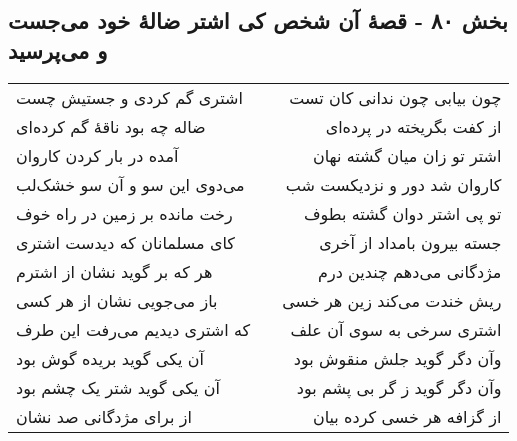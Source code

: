 \begin{center}
\section*{بخش ۸۰ - قصهٔ آن شخص کی اشتر ضالهٔ خود می‌جست و می‌پرسید}
\label{sec:sh080}
\begin{longtable}{l p{0.5cm} r}
اشتری گم کردی و جستیش چست
&&
چون بیابی چون ندانی کان تست
\\
ضاله چه بود ناقهٔ گم کرده‌ای
&&
از کفت بگریخته در پرده‌ای
\\
آمده در بار کردن کاروان
&&
اشتر تو زان میان گشته نهان
\\
می‌دوی این سو و آن سو خشک‌لب
&&
کاروان شد دور و نزدیکست شب
\\
رخت مانده بر زمین در راه خوف
&&
تو پی اشتر دوان گشته بطوف
\\
کای مسلمانان که دیدست اشتری
&&
جسته بیرون بامداد از آخری
\\
هر که بر گوید نشان از اشترم
&&
مژدگانی می‌دهم چندین درم
\\
باز می‌جویی نشان از هر کسی
&&
ریش خندت می‌کند زین هر خسی
\\
که اشتری دیدیم می‌رفت این طرف
&&
اشتری سرخی به سوی آن علف
\\
آن یکی گوید بریده گوش بود
&&
وآن دگر گوید جلش منقوش بود
\\
آن یکی گوید شتر یک چشم بود
&&
وآن دگر گوید ز گر بی پشم بود
\\
از برای مژدگانی صد نشان
&&
از گزافه هر خسی کرده بیان
\\
\end{longtable}
\end{center}
